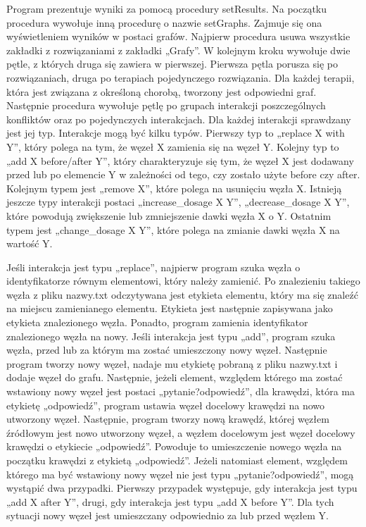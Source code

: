 \documentclass[oneside,a4paper]{book}
\begin{document}
\begin{spacing}{1.5}
Program prezentuje wyniki za pomocą procedury setResults. Na początku procedura wywołuje inną procedurę o nazwie setGraphs. Zajmuje się ona wyświetleniem wyników w postaci grafów. Najpierw procedura usuwa wszystkie zakładki z rozwiązaniami z zakładki „Grafy”. W kolejnym kroku wywołuje dwie pętle, z których druga się zawiera w pierwszej. Pierwsza pętla porusza się po rozwiązaniach, druga po terapiach pojedynczego rozwiązania. Dla każdej terapii, która jest związana z określoną chorobą, tworzony jest odpowiedni graf. Następnie procedura wywołuje pętlę po grupach interakcji poszczególnych konfliktów oraz po pojedynczych interakcjach. Dla każdej interakcji sprawdzany jest jej typ. Interakcje mogą być kilku typów. Pierwszy typ to „replace X with Y”, który polega na tym, że węzeł X zamienia się na węzeł Y. Kolejny typ to „add X before/after Y”, który charakteryzuje się tym, że węzeł X jest dodawany przed lub po elemencie Y w zależności od tego, czy zostało użyte before czy after. Kolejnym typem jest „remove X”, które polega na usunięciu węzła X. Istnieją jeszcze typy interakcji postaci „increase\_dosage X Y”, „decrease\_dosage X Y”, które powodują zwiększenie lub zmniejszenie dawki węzła X o Y. Ostatnim typem jest „change\_dosage X Y”, które polega na zmianie dawki węzła X na wartość Y.  

Jeśli interakcja jest typu „replace”, najpierw program szuka węzła o identyfikatorze równym elementowi, który należy zamienić. Po znalezieniu takiego węzła z pliku nazwy.txt odczytywana jest etykieta elementu, który ma się znaleźć na miejscu zamienianego elementu. Etykieta jest następnie zapisywana jako etykieta znalezionego węzła. Ponadto, program zamienia identyfikator znalezionego węzła na nowy. Jeśli interakcja jest typu „add”, program szuka węzła, przed lub za którym ma zostać umieszczony nowy węzeł. Następnie program tworzy nowy węzeł, nadaje mu etykietę pobraną z pliku nazwy.txt i dodaje węzeł do grafu. Następnie, jeżeli element, względem którego ma zostać wstawiony nowy węzeł jest postaci „pytanie?odpowiedź”, dla krawędzi, która ma etykietę „odpowiedź”, program ustawia węzeł docelowy krawędzi na nowo utworzony węzeł. Następnie, program tworzy nową krawędź, której węzłem źródłowym jest nowo utworzony węzeł, a węzłem docelowym jest węzeł docelowy krawędzi o etykiecie „odpowiedź”. Powoduje to umieszczenie nowego węzła na początku krawędzi z etykietą „odpowiedź”. Jeżeli natomiast element, względem którego ma być wstawiony nowy węzeł nie jest typu „pytanie?odpowiedź”, mogą wystąpić dwa przypadki. Pierwszy przypadek występuje, gdy interakcja jest typu „add X after Y”, drugi, gdy interakcja jest typu „add X before Y”. Dla tych sytuacji nowy węzeł jest umieszczany odpowiednio za lub przed węzłem Y. 


\end{spacing}
\end{document}
